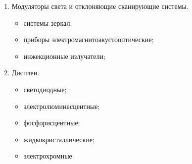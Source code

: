 \documentclass[12pt, russian, oneside, article]{ncc}
\begin{document}
\begin{enumerate}
\item Модуляторы света и отклоняющие сканирующие системы.

\begin{itemize}
\item системы зеркал;
\item приборы электромагнитоакустооптические;
\item инжекционные излучатели;
\end{itemize}

\item Дисплеи.

\begin{itemize}
\item светодиодные;
\item электролюминесцентные;
\item фосфорисцентные;
\item жидкокристаллические;
\item электрохромные.
\end{itemize}

\end{enumerate}
\end{document}
